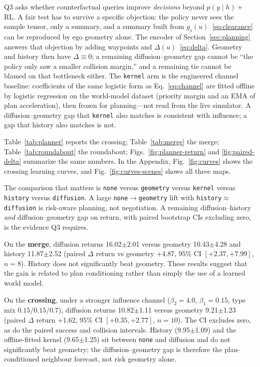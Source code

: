 \documentclass[conference]{IEEEtran}
\newcommand{\GeometryReturn}{9.21$\pm$1.23}
\newcommand{\KernelReturn}{9.65$\pm$1.25}
\newcommand{\HistoryReturn}{9.95$\pm$1.09}
\newcommand{\DiffusionReturn}{10.82$\pm$1.11}
\newcommand{\diffusionRet}{+1.62}
\newcommand{\diffusionRetLo}{+0.35}
\newcommand{\diffusionRetHi}{+2.77}
\newcommand{\diffusionRetN}{10}
\newcommand{\MergeGeometryReturn}{10.43$\pm$4.28}
\newcommand{\MergeHistoryReturn}{11.87$\pm$2.52}
\newcommand{\MergeDiffusionReturn}{16.02$\pm$2.01}
\newcommand{\MergediffusionRet}{+4.87}
\newcommand{\MergediffusionRetLo}{+2.37}
\newcommand{\MergediffusionRetHi}{+7.99}
\newcommand{\MergediffusionRetN}{8}
\begin{document}
Q3 asks whether counterfactual queries improve \emph{decisions} beyond
$p(y\mid h)+$RL. A fair test has to survive a specific objection: the policy
never sees the sample tensor, only a summary, and a summary built from
$g_s(u)$~\eqref{eq:clearance} can be reproduced by ego geometry alone. The
encoder of Section~\ref{sec:planning} answers that objection by adding waypoints
and $\Delta(u)$~\eqref{eq:delta}. Geometry and history then have
$\Delta\equiv 0$; a remaining diffusion--geometry gap cannot be ``the policy
only saw a smaller collision margin,'' and a remaining tie cannot be blamed on
that bottleneck either. The \texttt{kernel} arm is the engineered channel
baseline: coefficients of the same logistic form as Eq.~\eqref{eq:channel} are
fitted offline by logistic regression on the world-model dataset (priority
margin and an EMA of plan acceleration), then frozen for planning---not read
from the live simulator. A diffusion--geometry gap that \texttt{kernel} also
matches is consistent with influence; a gap that history also matches is not.

Table~\ref{tab:planner} reports the crossing; Table~\ref{tab:merge} the merge;
Table~\ref{tab:roundabout} the roundabout; Figs.~\ref{fig:planner-return} and \ref{fig:paired-delta} summarize the same numbers. In the Appendix, Fig.~\ref{fig:curves} shows the crossing learning curves, and Fig.~\ref{fig:curves-scenes} shows all three maps.

The comparison that matters is
\texttt{none} versus \texttt{geometry} versus \texttt{kernel} versus
\texttt{history} versus \texttt{diffusion}. A large
\texttt{none}$\to$\texttt{geometry} lift with
\texttt{history}$\approx$\texttt{diffusion} is risk-aware planning, not
negotiation. A remaining diffusion--history \emph{and} diffusion--geometry gap
on return, with paired bootstrap CIs excluding zero, is the evidence Q3
requires.

On the \textbf{merge}, diffusion returns \MergeDiffusionReturn{} versus
geometry \MergeGeometryReturn{} and history \MergeHistoryReturn{}
(paired $\Delta$ return vs geometry \MergediffusionRet{}, $95\%$ CI
$[\MergediffusionRetLo{},\MergediffusionRetHi{}]$, $n{=}\MergediffusionRetN{}$).
History does not significantly beat geometry. These
results suggest that the gain is related to plan conditioning rather than
simply the use of a learned world model.

On the \textbf{crossing}, under a stronger influence channel
($\beta_2{=}4.0$, $\beta_1{=}0.15$, type mix $0.15/0.15/0.7$), diffusion
returns \DiffusionReturn{} versus geometry \GeometryReturn{} (paired
$\Delta$ return \diffusionRet{}, $95\%$ CI
$[\diffusionRetLo{},\diffusionRetHi{}]$, $n{=}\diffusionRetN{}$). The CI
excludes zero, as do the paired success and collision intervals. History
(\HistoryReturn{}) and the offline-fitted kernel (\KernelReturn{}) sit between
\texttt{none} and diffusion and do not significantly beat geometry; the
diffusion--geometry gap is therefore the plan-conditioned neighbour forecast,
not risk geometry alone.
\end{document}
